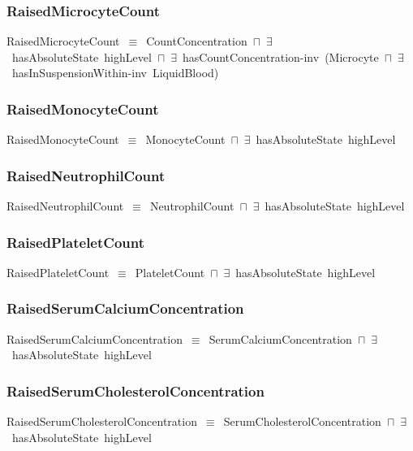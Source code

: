 \documentclass{article}
\begin{document}
\subsubsection*{RaisedMicrocyteCount}

RaisedMicrocyteCount~\ensuremath{\equiv}~CountConcentration~\ensuremath{\sqcap}~\ensuremath{\exists}~hasAbsoluteState~highLevel~\ensuremath{\sqcap}~\ensuremath{\exists}~hasCountConcentration-inv~(Microcyte~\ensuremath{\sqcap}~\ensuremath{\exists}~hasInSuspensionWithin-inv~LiquidBlood)

\subsubsection*{RaisedMonocyteCount}

RaisedMonocyteCount~\ensuremath{\equiv}~MonocyteCount~\ensuremath{\sqcap}~\ensuremath{\exists}~hasAbsoluteState~highLevel

\subsubsection*{RaisedNeutrophilCount}

RaisedNeutrophilCount~\ensuremath{\equiv}~NeutrophilCount~\ensuremath{\sqcap}~\ensuremath{\exists}~hasAbsoluteState~highLevel

\subsubsection*{RaisedPlateletCount}

RaisedPlateletCount~\ensuremath{\equiv}~PlateletCount~\ensuremath{\sqcap}~\ensuremath{\exists}~hasAbsoluteState~highLevel

\subsubsection*{RaisedSerumCalciumConcentration}

RaisedSerumCalciumConcentration~\ensuremath{\equiv}~SerumCalciumConcentration~\ensuremath{\sqcap}~\ensuremath{\exists}~hasAbsoluteState~highLevel

\subsubsection*{RaisedSerumCholesterolConcentration}

RaisedSerumCholesterolConcentration~\ensuremath{\equiv}~SerumCholesterolConcentration~\ensuremath{\sqcap}~\ensuremath{\exists}~hasAbsoluteState~highLevel
\end{document}
